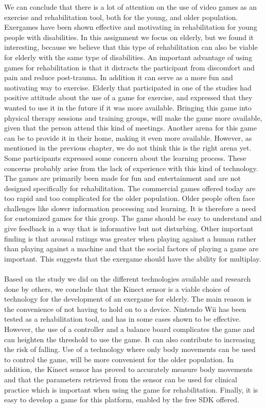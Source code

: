 We can conclude that there is a lot of attention on the use of video games as an exercise and rehabilitation tool, both for the young, and older population. Exergames have been shown effective and motivating in rehabilitation for young people with disabilities. In this assignment we focus on elderly, but we found it interesting, because we believe that  this type of rehabilitation can also be viable for elderly with the same type of disabilities. An important advantage of using games for rehabilitation is that it distracts the participant from discomfort and pain and reduce post-trauma. In addition it can serve as a more fun and motivating way to exercise. Elderly that participated in one of the studies had positive attitude about the use of a game for exercise, and expressed that they wanted to use it in the future if it was more available. Bringing this game into physical therapy sessions and training groups, will make the game more available, given that the  person attend this kind of meetings. Another arena for this game can be to provide it in their home, making it even more available. However, as mentioned in the previous chapter, we do not think this is the right arena yet.  Some participants  expressed some concern about the learning process. These concerns probably arise from the lack of experience with this kind of technology.  The games are primarily been made for fun and entertainment and are not designed specifically for rehabilitation.  The commercial games offered today are too rapid and too complicated for the older population. Older people often face challenges like slower information processing and learning. It is therefore a need for customized games for this group. The game should be easy to understand and give feedback in a way that is informative but not disturbing. Other important finding is that arousal ratings was greater when playing against a human rather than playing against a machine and that the social factors of playing a game are important. This suggests that the exergame should have the ability for multiplay.  \\ \\
Based on the study we did on the different technologies available and research done by others, we conclude that the Kinect sensor is a viable choice of technology for the development of an exergame for elderly. The main reason is the convenience of not having to hold on to a device. Nintendo Wii has been tested as a rehabilitation tool, and has in some cases shown to be effective. However, the use of a controller and a balance board complicates the game and can heighten the threshold to use the game. It can also contribute to increasing the risk of falling.  Use of a technology where only body movements can be used to control the game, will be more convenient for the older population. In addition, the Kinect sensor has proved to accurately measure body movements and that the parameters retrieved from the sensor can be used for clinical practice which is important when using the game for rehabilitation. Finally,  it is easy to develop a game for this platform, enabled by the free SDK offered.\\ \\






